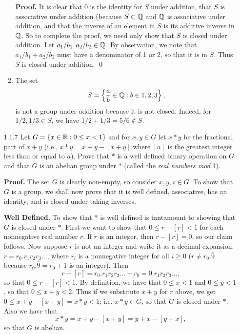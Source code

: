 \begin{enumerate}
\begin{enumerate}
               \textbf{Proof.} It is clear that 0 is the identity for $S$ under
               addition, that $S$ is associative under addition (because
               $S \subset \mathbb{Q}$ and $\mathbb{Q}$ is associative under addition, and that
               the inverse of an element in $S$ is its additive inverse in $\mathbb{Q}$.
               So to complete the proof, we need only show that $S$ is closed
               under addition. Let $a_1/b_1, a_2/b_2 \in \mathbb{Q}$. By observation, we
               note that $a_1/b_1 + a_2/b_2$ must have a denominator of 1 or 2,
               so that it is in $S$. Thus $S$ is closed under addition. \qed
         \item The set
               $$S = \left\{\frac{a}{b} \in \mathbb{Q} : b \in {1, 2, 3} \right\},$$
               is not a group under addition because it is not closed. Indeed,
               for $1/2, 1/3 \in S$, we have $1/2 + 1/3 = 5/6 \notin S$.
      \end{enumerate}
   \item[1.1.7]   Let $G = \{x \in \mathbb{R} : 0 \le x < 1\}$ and for $x, y \in G$ let
                  $x * y$ be the fractional part of $x + y$ (i.e.,
                  $x * y = x + y - [x + y]$ where $[a]$ is the greatest integer
                  less than or equal to $a$). Prove that $*$ is a well defined
                  binary operation on $G$ and that $G$ is an abelian group under
                  $*$ (called the \textit{real numbers mod }1).
                  
      \textbf{Proof.} The set $G$ is clearly non-empty, so consider
      $x, y, z \in G$. To show that $G$ is a group, we shall now prove that it 
      is well defined, associative, has an identity, and is closed under taking
      inverses.

      \textbf{Well Defined.} To show that $*$ is well defined is tantamount to
      showing that $G$ is closed under $*$.  First we want to show that
      $0 \le r - [r] < 1$ for each nonnegative real number $r$. If $r$ is an
      integer, then $r - [r] = 0$, so our claim follows. Now suppose $r$ is not
      an integer and write it as a decimal expansion: $r = r_0.r_1r_2r_3\ldots$,
      where $r_i$ is a nonnegative integer for all $i \ge 0$
      ($r \neq r_0.\overline{9}$ because $r_0.\overline{9} = r_0 + 1$ is an 
      integer). Then
      $$r - [r] = r_0.r_1r_2r_3\ldots - r_0 = 0.r_1r_2r_3\ldots,$$
      so that $0 \le r - [r] < 1$. By definition, we have that
      $0 \le x < 1$ and $0 \le y < 1$, so that $0 \le x + y < 2$. Thus if we
      substitute $x + y$ for $r$ above, we get
      $0 \le x + y  - [x + y] = x * y < 1$; i.e. $x * y \in G$, so that $G$ 
      is closed under $*$. Also we have that
      $$x * y = x + y - [x + y] = y + x - [y + x],$$
      so that $G$ is abelian.


\end{enumerate}
